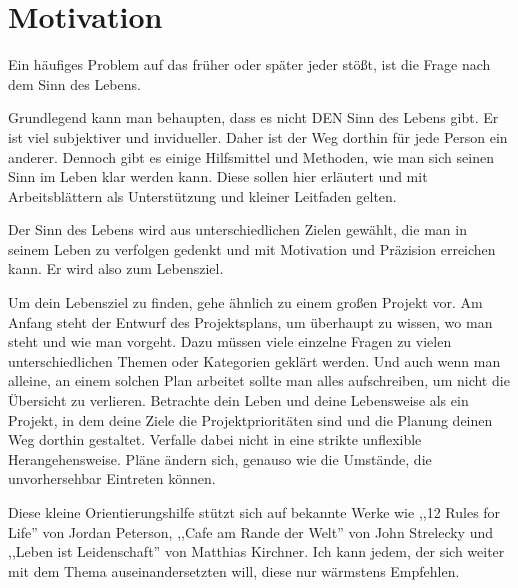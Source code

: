 \documentclass[../Lebensziel.tex]{subfiles}
\begin{document}
\chapter{Motivation}\thispagestyle{fancy}

Ein häufiges Problem auf das früher oder später jeder stößt, ist die Frage nach dem Sinn des Lebens.

Grundlegend kann man behaupten, dass es nicht DEN Sinn des Lebens gibt. Er ist viel subjektiver und invidueller. Daher ist der Weg dorthin für jede Person ein anderer. Dennoch gibt es einige Hilfsmittel und Methoden, wie man sich seinen Sinn im Leben klar werden kann. Diese sollen hier erläutert und mit Arbeitsblättern als Unterstützung und kleiner Leitfaden gelten.

Der Sinn des Lebens wird aus unterschiedlichen Zielen gewählt, die man in seinem Leben zu verfolgen gedenkt und mit Motivation und Präzision erreichen kann. Er wird also zum Lebensziel.
\vspace{.5cm}

Um dein Lebensziel zu finden, gehe ähnlich zu einem großen Projekt vor. Am Anfang steht der Entwurf des Projektsplans, um überhaupt zu wissen, wo man steht und wie man vorgeht. Dazu müssen viele einzelne Fragen zu vielen unterschiedlichen Themen oder Kategorien geklärt werden. Und auch wenn man alleine, an einem solchen Plan arbeitet sollte man alles aufschreiben, um nicht die Übersicht zu verlieren. Betrachte dein Leben und deine Lebensweise als ein Projekt, in dem deine Ziele die Projektprioritäten sind und die Planung deinen Weg dorthin gestaltet.
Verfalle dabei nicht in eine strikte unflexible Herangehensweise. Pläne ändern sich, genauso wie die Umstände, die unvorhersehbar Eintreten können.
\vspace{.5cm}

Diese kleine Orientierungshilfe stützt sich auf bekannte Werke wie ,,12 Rules for Life''\cite{rules-for-life} von Jordan Peterson, ,,Cafe am Rande der Welt''\cite{cafe-rande-welt} von John Strelecky und ,,Leben ist Leidenschaft''\cite{leben-leidenschaft} von Matthias Kirchner. Ich kann jedem, der sich weiter mit dem Thema auseinandersetzten will, diese nur wärmstens Empfehlen.
\end{document}

